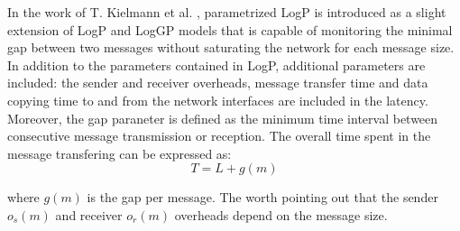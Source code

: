 In the work of T. Kielmann et al. \cite{kielmann2000fast}, parametrized LogP is introduced as a slight extension of LogP and LogGP models that is capable of monitoring the minimal gap between two messages without saturating the network for each message size. In addition to the parameters contained in LogP, additional parameters are included: the sender and receiver overheads, message transfer time and data copying time to and from the network interfaces are included in the latency. Moreover, the gap paraneter is defined as the minimum time interval between consecutive message transmission or reception. The overall time spent in the message transfering can be expressed as:
\begin{equation*}
T = L + g(m)
\end{equation*}

where $g(m)$ is the gap per message. The worth pointing out that the sender $o_s(m)$ and receiver $o_r(m)$ overheads depend on the message size.
